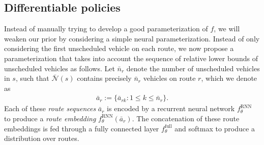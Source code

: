 \documentclass[a4paper]{report}
\theoremstyle{definition}
\theoremstyle{plain}
\newtheorem{proposition}{Proposition}[chapter]
\DeclareMathOperator*{\argmin}{arg\,min}
\begin{document}


\subsection{Differentiable policies}\label{sec:neural-param}

Instead of manually trying to develop a good parameterization of $f$, we will
weaken our prior by considering a simple neural parameterization.
%
Instead of only considering the first unscheduled vehicle on each route, we now
propose a parameterization that takes into account the sequence of relative
lower bounds of unscheduled vehicles as follows.
%
Let $\bar{n}_r$ denote the number of unscheduled vehicles in $s$, such that
$\bar{\mathcal{N}}(s)$ contains precisely $\bar{n}_r$ vehicles on route $r$,
which we denote as
%
\begin{align}
  \bar{a}_r := \{ \bar{a}_{rk} : 1 \leq k \leq \bar{n}_r \} .
\end{align}
%
Each of these \emph{route sequences} $\bar{a}_r$ is encoded by a recurrent
neural network $f^{\mathrm{RNN}}_\theta$ to produce a \emph{route embedding}
$f^{\mathrm{RNN}}_\theta(\bar{a}_r)$.
%
The concatenation of these route embeddings is fed through a fully connected
layer $f^{\mathrm{full}}_\theta$ and softmax to produce a distribution over
routes.
\end{document}
